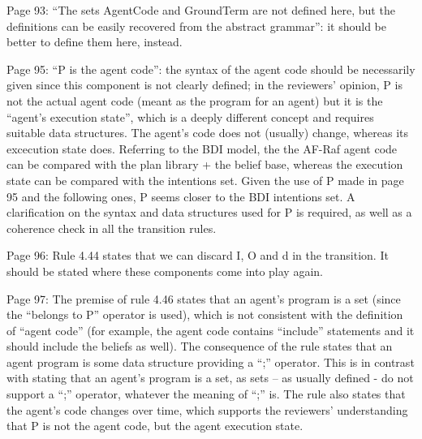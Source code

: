 \documentclass{article}
\newcommand{\todo}[1]{[\textcolor{red}{TODO}: #1]}
\newenvironment{them}{\noindent\begingroup\color{blue}}{\endgroup\par}
\begin{document}
\begin{them}

Page 93:
“The sets AgentCode and GroundTerm are not defined here, but the definitions
can be easily recovered from the abstract grammar”: it should be better to
define them here, instead.

\end{them}
\todo{}

\begin{them}

Page 95:
“P is the agent code”: the syntax of the agent code should be necessarily given
since this component is not clearly defined; in the reviewers' opinion, P is
not the actual agent code (meant as the program for an agent) but it is the
“agent's execution state”, which is a deeply different concept and requires
suitable data structures. The agent's code does not (usually) change, whereas
its excecution state does. Referring to the BDI model, the the AF-Raf agent
code can be compared with the plan library + the belief base, whereas the
execution state can be compared with the intentions set. Given the use of P
made in page 95 and the following ones, P seems closer to the BDI intentions
set. A clarification on the syntax and data structures used for P is required,
as well as a coherence check in all the transition rules.

\end{them}
\todo{}

\begin{them}

Page 96:
Rule 4.44 states that we can discard I, O and d in the transition. It should be
stated where these components come into play again.

\end{them}
\todo{}

\begin{them}

Page 97:
The premise of rule 4.46 states that an agent's program is a set (since the
“belongs to P” operator is used), which is not consistent with the definition
of “agent code” (for example, the agent code contains “include” statements and
it should include the beliefs as well). The consequence of the rule states that
an agent program is some data structure providing a “;” operator. This is in
contrast with stating that an agent's program is a set, as sets – as usually
defined - do not support a “;” operator, whatever the meaning of “;” is. The
rule also states that the agent's code changes over time, which supports the
reviewers' understanding that P is not the agent code, but the agent execution
state.

\end{them}
\todo{}
\end{document}
